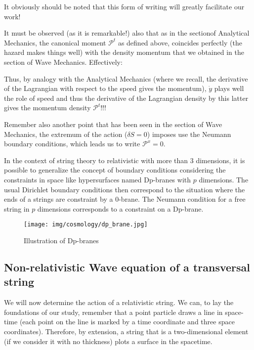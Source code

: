 	\begin{tcolorbox}[title=Remark,colframe=black,arc=10pt]
	It obviously should be noted that this form of writing will greatly facilitate our work!
	\end{tcolorbox}
	It must be observed (as it is remarkable!) also that as in the sectionof Analytical Mechanics, the canonical moment $\mathcal{P}^t$ as defined above, coincides perfectly (the hazard makes things well) with the density momentum that we obtained in the section of Wave Mechanics. Effectively:
	
	Thus, by analogy with the Analytical Mechanics (where we recall, the derivative of the Lagrangian with respect to the speed gives the momentum), $\dot{y}$ plays well the role of speed and thus the derivative of the Lagrangian density by this latter gives the momentum density $\mathcal{P}^t$!!!
	
	Remember also another point that has been seen in the section of Wave Mechanics, the extremum of the action ($\delta S=0$) imposes use the Neumann boundary conditions, which leads us to write $\mathcal{P}^x=0$.
	\begin{tcolorbox}[title=Remark,colframe=black,arc=10pt]
	In the context of string theory to relativistic with more than 3 dimensions, it is possible to generalize the concept of boundary conditions considering the constraints in space like hypersurfaces named Dp-branes with $p$ dimensions. The usual Dirichlet boundary conditions then correspond to the situation where the ends of a strings are constraint by a 0-brane. The Neumann condition for a free string in $p$ dimensions corresponds to a constraint on a Dp-brane.
	\begin{figure}[H]
		\begin{center}
		\texttt{[image: img/cosmology/dp\_brane.jpg]}
		\end{center}	
		\caption[]{Illustration of Dp-branes}
	\end{figure}
	\end{tcolorbox}
	
	\subsection{Non-relativistic Wave equation of a transversal string}
	We will now determine the action of a relativistic string. We can, to lay the foundations of our study, remember that a point particle draws a line in space-time (each point on the line is marked by a time coordinate and three space coordinates). Therefore, by extension, a string that is a two-dimensional element (if we consider it with no thickness) plots a surface in the spacetime.
	
